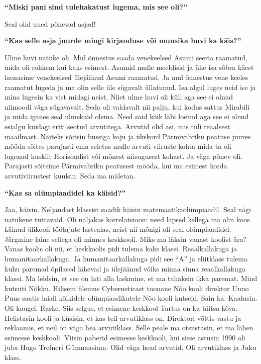 \textbf{\enquote{Miski pani sind tulehakatust lugema, mis see oli?}}

Seal olid uued põnevad asjad!

\textbf{\enquote{Kas selle asja juurde mingi kirjanduse või muusika huvi ka käis?}}

Ulme huvi natuke oli. Mul õnnestus saada venekeelsed Asumi seeria raamatud, mida oli rohkem kui kaks esimest. Asumid mulle meeldisid ja ühe isa sõbra käest laenasime venekeelsed ülejäänud Asumi raamatud. Ja mul õnnestus vene keeles raamatut lugeda ja ma olin selle üle sügavalt üllatunud. Isa algul luges neid ise ja mina lugesin ka vist midagi neist. Niiet ulme huvi oli küll aga see ei olnud niimoodi väga sügavavalt. Seda oli valdavalt nii palju, kui kodus sattus Mirabili ja mida iganes seal ulmekaid olema. Need said kõik läbi loetud aga see ei olnud esialgu kuidagi eriti seotud arvutitega. Arvutid olid asi, mis tuli reaalsest maailmast. Näiteks sõitsin bussiga koju ja ükskord Pärmivabriku peatuse juures mööda sõites parajasti ema seletas mulle arvuti viiruste kohta mida ta oli lugenud kuskilt Horisondist või mõnest niisugusest kohast. Ja väga põnev oli. Parajasti sõitsime Pärmivabriku peatusest mööda, kui ma esimest korda arvutiviirustest kuulsin. Seda ma mäletan. 

\textbf{\enquote{Kas sa olümpiaadidel ka käisid?}}

Jaa, käisin. Neljandast klassist saadik käisin matemaatikaolümpiaadil. Seal nägi natukene tuttavaid. Oli naljakas korrelatsioon: need lapsed kellega ma olin koos käinud ülikooli töötajate lasteaias, neist nii mõnigi oli seal olümpiaadidel. Järgmine laine sellega oli minnes keskkooli. Miks ma läksin vanast koolist ära? Vanas koolis oli nii, et keskkoolis pidi tulema kaks klassi. Reaalkallakuga ja humanitaarkallakuga. Ja humanitaarkallakuga pidi see \enquote{A} ja eliitklass tulema kuhu paremad õpilased lähevad ja ülejäänud võiks minna sinna reaalkallakuga klassi. Ma leidsin, et see on lati alla laskmine, et ma tahaksin ikka paremat. Mind kutsuti Nõkku. Hilisem ülemus Cyberneticast toonane Nõo kooli direktor Uuno Puus saatis laiali kõikidele olümpiaadikutele Nõo kooli kutseid. Sain ka. Kaalusin. Oli kaugel. Raske. Siis selgus, et esimene keskkool Tartus on ka täitsa kõva. Helistasin kooli ja küsisin, et kas teil arvutiklass on. Direktori võttis vastu ja reklaamis, et neil on väga hea arvutiklass. Selle peale ma otsustasin, et ma lähen esimesse keskkooli. Viisin paberid esimesse keskkooli, kui sisse astusin 1990 oli juba Hugo Trefneri Gümnaasium. Olid väga head arvutid. Oli arvutiklass ja Juku klass. 

